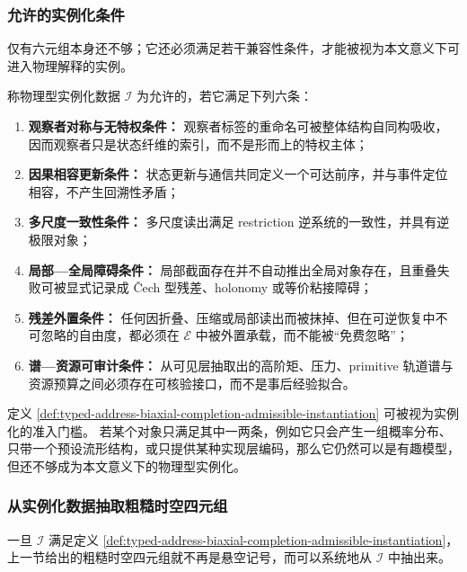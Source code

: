 \subsubsection{允许的实例化条件}\label{subsubsec:typed-address-biaxial-completion-admissible-instantiation}
仅有六元组本身还不够；它还必须满足若干兼容性条件，才能被视为本文意义下可进入物理解释的实例。

\begin{definition}[允许的物理型实例化]\label{def:typed-address-biaxial-completion-admissible-instantiation}
称物理型实例化数据 \(\mathcal I\) 为允许的，若它满足下列六条：
\begin{enumerate}
  \item \textbf{观察者对称与无特权条件：}
  观察者标签的重命名可被整体结构自同构吸收，因而观察者只是状态纤维的索引，而不是形而上的特权主体；
  \item \textbf{因果相容更新条件：}
  状态更新与通信共同定义一个可达前序，并与事件定位相容，不产生回溯性矛盾；
  \item \textbf{多尺度一致性条件：}
  多尺度读出满足 restriction 逆系统的一致性，并具有逆极限对象；
  \item \textbf{局部—全局障碍条件：}
  局部截面存在并不自动推出全局对象存在，且重叠失败可被显式记录成 Čech 型残差、holonomy 或等价粘接障碍；
  \item \textbf{残差外置条件：}
  任何因折叠、压缩或局部读出而被抹掉、但在可逆恢复中不可忽略的自由度，都必须在 \(\mathcal E\) 中被外置承载，而不能被“免费忽略”；
  \item \textbf{谱—资源可审计条件：}
  从可见层抽取出的高阶矩、压力、primitive 轨道谱与资源预算之间必须存在可核验接口，而不是事后经验拟合。
\end{enumerate}
\end{definition}

定义 \ref{def:typed-address-biaxial-completion-admissible-instantiation} 可被视为实例化的准入门槛。
若某个对象只满足其中一两条，例如它只会产生一组概率分布、只带一个预设流形结构，或只提供某种实现层编码，那么它仍然可以是有趣模型，但还不够成为本文意义下的物理型实例化。

\subsubsection{从实例化数据抽取粗糙时空四元组}\label{subsubsec:typed-address-biaxial-completion-instantiation-to-rough-spacetime}
一旦 \(\mathcal I\) 满足定义 \ref{def:typed-address-biaxial-completion-admissible-instantiation}，上一节给出的粗糙时空四元组就不再是悬空记号，而可以系统地从 \(\mathcal I\) 中抽出来。

